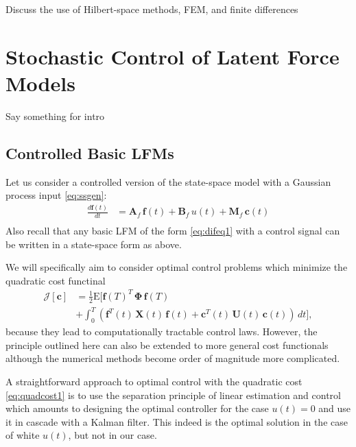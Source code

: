 \documentclass[journal]{IEEEtran}
\newcommand{\simo}[1]{{\color{red}#1}}
\begin{document}
\simo{Discuss the use of Hilbert-space methods, FEM, and finite differences}

\section{Stochastic Control of Latent Force Models}
%

\simo{Say something for intro}

\subsection{Controlled Basic LFMs}
%
Let us consider a controlled version of the state-space model with a Gaussian process input \eqref{eq:ssgen}:
\begin{equation}
\begin{split}
  \frac{d\mathbf{f}(t)}{dt}
  &= \mathbf{A}_f \, \mathbf{f}(t) + \mathbf{B}_f \, u(t) + \mathbf{M}_f \, \mathbf{c}(t) \\
\end{split}
\end{equation}
%
Also recall that any basic LFM of the form \eqref{eq:difeq1} with a control signal can be written in a state-space form as above.

We will specifically aim to consider optimal control problems which minimize the quadratic cost functinal
%
\begin{equation}
\begin{split}
  \mathcal{J}[\mathbf{c}] &= \frac{1}{2} \mathrm{E} \Big[
    \mathbf{f}(T)^T \, \boldsymbol{\Phi} \, \mathbf{f}(T) \\
   &+ \int_0^T
   (\mathbf{f}^T(t) \, \mathbf{X}(t) \, \mathbf{f}(t)
  + \mathbf{c}^T(t) \, \mathbf{U}(t) \, \mathbf{c}(t)) \, dt \Big],
\end{split}
\label{eq:quadcost1}
\end{equation}
%
because they lead to computationally tractable control laws. However, the principle outlined here can also be extended to more general cost functionals although the numerical methods become order of magnitude more complicated.

A straightforward approach to optimal control with the quadratic cost \eqref{eq:quadcost1} is to use the separation principle of linear estimation and control which amounts to designing the optimal controller for the case $u(t) = 0$ and use it in cascade with a Kalman filter. This indeed is the optimal solution in the case of white $u(t)$, but not in our case.
\end{document}
